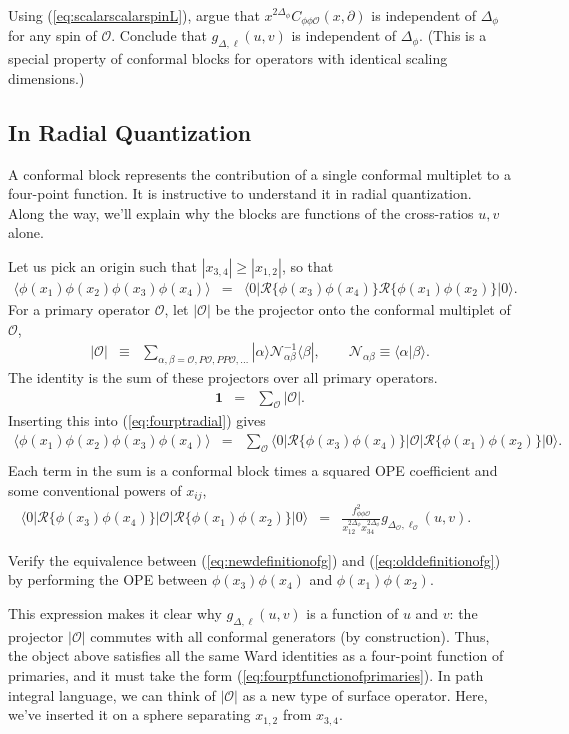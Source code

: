 \documentclass[12pt]{article}
\numberwithin{equation}{section}
\newcommand\be{\begin{eqnarray}}
\newcommand\ee{\end{eqnarray}}
\newcommand\f\phi
\newcommand\cO{\mathcal{O}}
\newcommand\ptl\partial
\newcommand\<\langle
\renewcommand\>\rangle
\newcommand\nn{\nonumber}
\renewcommand\.{\cdot}
\newcommand\De{\Delta}
\renewcommand\b\beta
\renewcommand\a\alpha
\begin{document}
Using (\ref{eq:scalarscalarspinL}), argue that $x^{2\De_\f} C_{\f\f\cO}(x,\ptl)$ is independent of $\Delta_\phi$ for any spin of $\cO$. Conclude that $g_{\De,\ell}(u,v)$ is independent of $\Delta_\phi$. (This is a special property of conformal blocks for operators with identical scaling dimensions.)


\subsection{In Radial Quantization}

A conformal block represents the contribution of a single conformal multiplet to a four-point function.  It is instructive to understand it in radial quantization.  Along the way, we'll explain why the blocks are functions of the cross-ratios $u,v$ alone.

Let us pick an origin such that $|x_{3,4}|\geq |x_{1,2}|$, so that
\be
\label{eq:fourptradial}
\<\f(x_1)\f(x_2)\f(x_3)\f(x_4)\> &=& \<0|\mathcal{R}\{\f(x_3)\f(x_4)\}\mathcal{R}\{\f(x_1)\f(x_2)\}|0\>.\quad
\ee
For a primary operator $\cO$, let $|\cO|$ be the projector onto the conformal multiplet of $\cO$,
\be
|\cO| &\equiv& \sum_{\a,\b=\cO,P\cO,PP\cO,\dots} |\a\>\mathcal{N}^{-1}_{\a\b}\<\b|,\qquad
\mathcal{N}_{\a\b} \equiv \<\a|\b\>.
\ee
The identity is the sum of these projectors over all primary operators.
\be
\mathbf{1} &=& \sum_\cO |\cO|.
\ee
Inserting this into (\ref{eq:fourptradial}) gives
\be
\label{eq:insertingprojector}
\<\f(x_1)\f(x_2)\f(x_3)\f(x_4)\> &=& \sum_\cO\<0|\mathcal{R}\{\f(x_3)\f(x_4)\}|\cO|\mathcal{R}\{\f(x_1)\f(x_2)\}|0\>.\nn\\
\ee
Each term in the sum is a conformal block times a squared OPE coefficient and some conventional powers of $x_{ij}$,
\be
\label{eq:newdefinitionofg}
\<0|\mathcal{R}\{\f(x_3)\f(x_4)\}|\cO|\mathcal{R}\{\f(x_1)\f(x_2)\}|0\> &=& \frac{f_{\f\f\cO}^2}{x_{12}^{2\De_\f}x_{34}^{2\De_\f}}g_{\De_\cO,\ell_\cO}(u,v).\qquad
\ee

Verify the equivalence between (\ref{eq:newdefinitionofg}) and (\ref{eq:olddefinitionofg}) by performing the OPE between $\f(x_3)\f(x_4)$ and $\f(x_1)\f(x_2)$.


This expression makes it clear why $g_{\De,\ell}(u,v)$ is a function of $u$ and $v$: the projector $|\cO|$ commutes with all conformal generators (by construction).  Thus, the object above satisfies all the same Ward identities as a four-point function of primaries, and it must take the form (\ref{eq:fourptfunctionofprimaries}).  In path integral language, we can think of $|\cO|$ as a new type of  surface operator.  Here, we've inserted it on a sphere separating $x_{1,2}$ from $x_{3,4}$.
\end{document}
